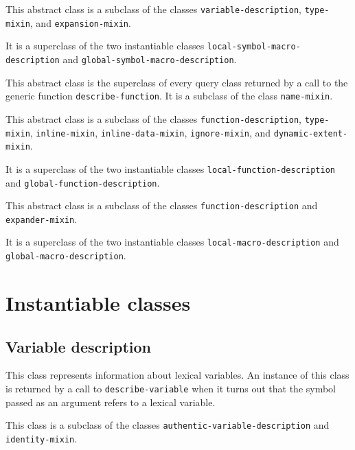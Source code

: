 This abstract class is a subclass of the classes
\texttt{variable-description}, \texttt{type-mixin}, and
\texttt{expansion-mixin}.

It is a superclass of the two instantiable classes
\texttt{local-symbol-macro-description} and
\texttt{global-symbol-macro-description}.

{\footnotesize
{}
}

This abstract class is the superclass of every query class returned by
a call to the generic function \texttt{describe-function}.  It is a
subclass of the class \texttt{name-mixin}.

{\footnotesize
{}
}

This abstract class is a subclass of the classes
\texttt{function-description}, \texttt{type-mixin},
\texttt{inline-mixin}, \texttt{inline-data-mixin},
\texttt{ignore-mixin}, and \texttt{dynamic-extent-mixin}.

It is a superclass of the two instantiable classes
\texttt{local-function-description} and
\texttt{global-function-description}.

{\footnotesize
{}
}

This abstract class is a subclass of the classes
\texttt{function-description} and \texttt{expander-mixin}.

It is a superclass of the two instantiable classes
\texttt{local-macro-description} and
\texttt{global-macro-description}.

\section{Instantiable classes}
\label{sec-instantiable-query-classes}

\subsection{Variable description}
\label{sec-instantiable-classes-variable-description}

{\footnotesize
{}
}

This class represents information about lexical variables.  An
instance of this class is returned by a call to \texttt{describe-variable}
when it turns out that the symbol passed as an argument refers to a
lexical variable.

This class is a subclass of the classes
\texttt{authentic-variable-description} and \texttt{identity-mixin}.

